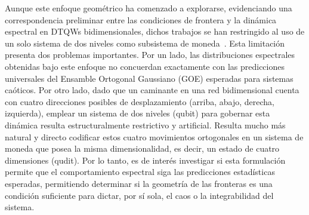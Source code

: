 \documentclass[11pt,a4paper]{article}  %
\begin{document}
Aunque este enfoque geométrico ha comenzado a explorarse, evidenciando una correspondencia preliminar entre las condiciones de frontera y la dinámica espectral en DTQWs bidimensionales,
dichos trabajos se han restringido al uso de un solo sistema de dos niveles como subsistema de moneda~\cite{alonso-lobo2025simplest}. Esta limitación presenta dos problemas importantes. 
Por un lado, las distribuciones espectrales obtenidas bajo este enfoque no concuerdan exactamente con las predicciones universales del Ensamble Ortogonal Gaussiano (GOE) esperadas para sistemas caóticos. 
Por otro lado, dado que un caminante en una red bidimensional cuenta con cuatro direcciones posibles de desplazamiento (arriba, abajo, derecha, izquierda), 
emplear un sistema de dos niveles (qubit) para gobernar esta dinámica resulta estructuralmente restrictivo y artificial. Resulta mucho más natural y directo codificar estos cuatro movimientos ortogonales en un sistema de moneda que posea la misma dimensionalidad, es decir, un estado de cuatro dimensiones (qudit). Por lo tanto, es de interés investigar si esta formulación permite que el comportamiento espectral siga las predicciones estadísticas esperadas, permitiendo determinar si la geometría de las fronteras es una condición suficiente para dictar, por sí sola, el caos o la integrabilidad del sistema.

 
        

\end{document}
